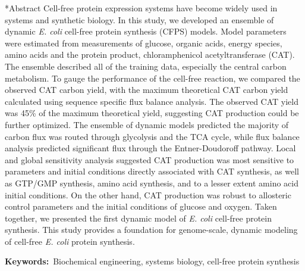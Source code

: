 \documentclass[12pt]{article}
\makeatletter
\renewcommand\section{\@startsection
	{subsection}{2}{0mm}
	{-0.2in}
	{0.05\baselineskip}
	{\normalfont\large\bfseries}}
\makeatother
\begin{document}
\section*{Abstract}
Cell-free protein expression systems have become widely used in systems and synthetic biology.
In this study, we developed an ensemble of dynamic \textit{E. coli} cell-free protein synthesis (CFPS) models.
Model parameters were estimated from measurements of glucose, organic acids, energy species, amino acids and the protein product, chloramphenicol acetyltransferase (CAT).
The ensemble described all of the training data, especially the central carbon metabolism.
To gauge the performance of the cell-free reaction, we compared the observed CAT carbon yield, with the maximum theoretical CAT carbon yield calculated using sequence specific flux balance analysis.
The observed CAT yield was 45\% of the maximum theoretical yield, suggesting CAT production could be further optimized.
The ensemble of dynamic models predicted the majority of carbon flux was routed through glycolysis and the TCA cycle, while flux balance analysis predicted significant flux through the Entner-Doudoroff pathway.
Local and global sensitivity analysis suggested CAT production was most sensitive to parameters and initial conditions directly associated with CAT synthesis, as well as GTP/GMP synthesis, amino acid synthesis, and to a lesser extent amino acid initial conditions.
On the other hand, CAT production was robust to allosteric control parameters and the initial conditions of glucose and oxygen.
Taken together, we presented the first dynamic model of \textit{E. coli} cell-free protein synthesis.
This study provides a foundation for genome-scale, dynamic modeling of cell-free \textit{E. coli} protein synthesis.

\vspace{0.1in}
{\noindent \textbf{Keywords:}~Biochemical engineering, systems biology, cell-free protein synthesis}

\pagebreak

\setcounter{page}{1}

\end{document}

